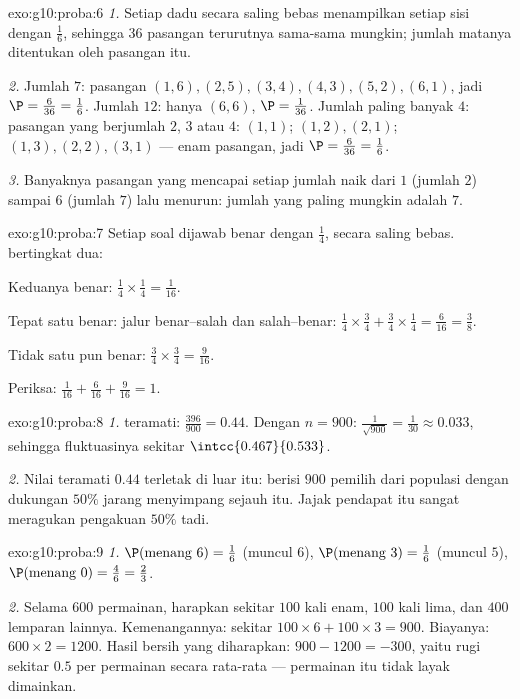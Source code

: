 \begin{solution}{exo:g10:proba:6}
\emph{1.} Setiap dadu secara saling bebas menampilkan setiap sisi dengan
 $\frac16$, sehingga $36$ pasangan terurutnya sama-sama mungkin; jumlah
matanya ditentukan oleh pasangan itu.

\emph{2.} Jumlah $7$: pasangan $(1,6), (2,5), (3,4), (4,3), (5,2), (6,1)$,
jadi $\P = \frac{6}{36} = \frac16$. Jumlah $12$: hanya $(6,6)$,
$\P = \frac{1}{36}$. Jumlah paling banyak $4$: pasangan yang berjumlah $2$,
$3$ atau $4$: $(1,1)$; $(1,2), (2,1)$; $(1,3), (2,2), (3,1)$ --- enam pasangan,
jadi $\P = \frac{6}{36} = \frac16$.

\emph{3.} Banyaknya pasangan yang mencapai setiap jumlah naik dari $1$ (jumlah
$2$) sampai $6$ (jumlah $7$) lalu menurun: jumlah yang paling mungkin adalah $7$.
\end{solution}

\begin{solution}{exo:g10:proba:7}
Setiap soal dijawab benar dengan  $\frac14$, secara saling
bebas.  bertingkat dua:

Keduanya benar: $\frac14 \times \frac14 = \frac{1}{16}$.

Tepat satu benar: jalur benar--salah dan salah--benar:
$\frac14 \times \frac34 + \frac34 \times \frac14 = \frac{6}{16}
= \frac38$.

Tidak satu pun benar: $\frac34 \times \frac34 = \frac{9}{16}$.

Periksa: $\frac{1}{16} + \frac{6}{16} + \frac{9}{16} = 1$.
\end{solution}

\begin{solution}{exo:g10:proba:8}
\emph{1.}  teramati: $\frac{396}{900} = 0.44$. Dengan
$n = 900$: $\frac{1}{\sqrt{900}} = \frac{1}{30} \approx 0.033$, sehingga
 fluktuasinya sekitar $\intcc{0.467}{0.533}$.

\emph{2.} Nilai teramati $0.44$ terletak di luar  itu:  berisi
$900$ pemilih dari populasi dengan dukungan $50\%$ jarang menyimpang sejauh
itu. Jajak pendapat itu sangat meragukan pengakuan $50\%$ tadi.
\end{solution}

\begin{solution}{exo:g10:proba:9}
\emph{1.} $\P(\text{menang } 6) = \frac16$ (muncul $6$),
$\P(\text{menang } 3) = \frac16$ (muncul $5$),
$\P(\text{menang } 0) = \frac46 = \frac23$.

\emph{2.} Selama $600$ permainan, harapkan sekitar $100$ kali enam, $100$ kali
lima, dan $400$ lemparan lainnya. Kemenangannya: sekitar
$100 \times 6 + 100 \times 3 = 900$. Biayanya: $600 \times 2 = 1200$. Hasil
bersih yang diharapkan: $900 - 1200 = -300$, yaitu rugi sekitar $0.5$ per
permainan secara rata-rata --- permainan itu tidak layak dimainkan.
\end{solution}

